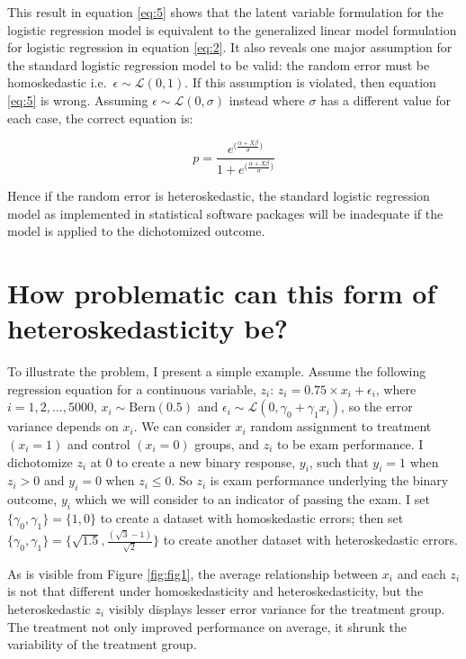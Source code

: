 \documentclass[
  english,
  doc]{apa6}
\begin{document}
This result in equation \eqref{eq:5} shows that the latent variable formulation for the logistic regression model is equivalent to the generalized linear model formulation for logistic regression in equation \eqref{eq:2}. It also reveals one major assumption for the standard logistic regression model to be valid: the random error must be homoskedastic i.e.~\(\epsilon\sim\mathcal{L}(0, 1)\). If this assumption is violated, then equation \eqref{eq:5} is wrong. Assuming \(\epsilon\sim\mathcal{L}(0, \sigma)\) instead where \(\sigma\) has a different value for each case, the correct equation is:

\begin{equation} \label{eq:6}
p=\frac{e^{\big(\frac{\alpha+X\beta}{\sigma}\big)}}{1+e^{\big(\frac{\alpha+X\beta}{\sigma}\big)}}
\end{equation}

Hence if the random error is heteroskedastic, the standard logistic regression model as implemented in statistical software packages will be inadequate if the model is applied to the dichotomized outcome.

\hypertarget{how-problematic-can-this-form-of-heteroskedasticity-be}{%
\section{How problematic can this form of heteroskedasticity be?}\label{how-problematic-can-this-form-of-heteroskedasticity-be}}

To illustrate the problem, I present a simple example. Assume the following regression equation for a continuous variable, \(z_i\): \(z_i = 0.75 \times x_i + \epsilon_i\), where \(i=1, 2, \dots, 5000\), \(x_i\sim\mathrm{Bern}(0.5)\) and \(\epsilon_i\sim\mathcal{L}(0, \gamma_0 + \gamma_1x_i)\), so the error variance depends on \(x_i\). We can consider \(x_i\) random assignment to treatment \((x_i=1)\) and control \((x_i=0)\) groups, and \(z_i\) to be exam performance. I dichotomize \(z_i\) at 0 to create a new binary response, \(y_i\), such that \(y_i = 1\) when \(z_i > 0\) and \(y_i = 0\) when \(z_i \leq 0\). So \(z_i\) is exam performance underlying the binary outcome, \(y_i\) which we will consider to an indicator of passing the exam. I set \(\{\gamma_0, \gamma_1\} = \{1, 0\}\) to create a dataset with homoskedastic errors; then set \(\{\gamma_0, \gamma_1\} = \{\sqrt{1.5}, \frac{(\sqrt{3}-1)}{\sqrt{2}}\}\) to create another dataset with heteroskedastic errors.

As is visible from Figure \ref{fig:fig1}, the average relationship between \(x_i\) and each \(z_i\) is not that different under homoskedasticity and heteroskedasticity, but the heteroskedastic \(z_i\) visibly displays lesser error variance for the treatment group. The treatment not only improved performance on average, it shrunk the variability of the treatment group.
\end{document}
